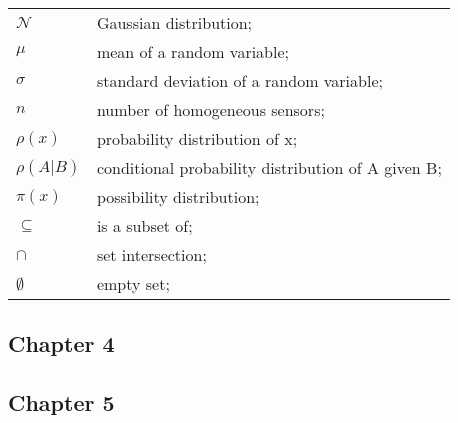\begin{longtable}{ll}
	$\mathcal{N}$			& Gaussian distribution; \\
	$\mu$ 					& mean of a random variable; \\
	$\sigma$ 				& standard deviation of a random variable;\\
	$n$						& number of homogeneous sensors; \\
	$\rho(x)$				& probability distribution of x; \\
	$\rho(A|B)$				& conditional probability distribution of A given B; \\
	$\pi(x)$				& possibility distribution; \\
	$\subseteq$				& is a subset of; \\
	$\cap$					& set intersection; \\
	$\emptyset$				& empty set; \\

\end{longtable}

\subsection*{Chapter 4}


\subsection*{Chapter 5}

\newpage
